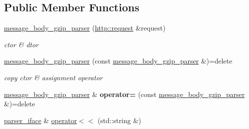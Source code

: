 \subsection*{Public Member Functions}
\begin{DoxyCompactItemize}
\item 
\mbox{\label{classnetflex_1_1parsing_1_1message__body__gzip__parser_a8f5b49b2af4bd6c96dad3959f04c763b}} 
\hyperlink{classnetflex_1_1parsing_1_1message__body__gzip__parser_a8f5b49b2af4bd6c96dad3959f04c763b}{message\+\_\+body\+\_\+gzip\+\_\+parser} (\hyperlink{classnetflex_1_1http_1_1request}{http\+::request} \&request)
\begin{DoxyCompactList}\small\item\em ctor \& dtor \end{DoxyCompactList}\item 
\mbox{\label{classnetflex_1_1parsing_1_1message__body__gzip__parser_a5c516454893dbda1a8ff93d7815b12a9}} 
\hyperlink{classnetflex_1_1parsing_1_1message__body__gzip__parser_a5c516454893dbda1a8ff93d7815b12a9}{message\+\_\+body\+\_\+gzip\+\_\+parser} (const \hyperlink{classnetflex_1_1parsing_1_1message__body__gzip__parser}{message\+\_\+body\+\_\+gzip\+\_\+parser} \&)=delete
\begin{DoxyCompactList}\small\item\em copy ctor \& assignment operator \end{DoxyCompactList}\item 
\mbox{\label{classnetflex_1_1parsing_1_1message__body__gzip__parser_ab28726f6d793f340cb630cfcaa6e3126}} 
\hyperlink{classnetflex_1_1parsing_1_1message__body__gzip__parser}{message\+\_\+body\+\_\+gzip\+\_\+parser} \& {\bfseries operator=} (const \hyperlink{classnetflex_1_1parsing_1_1message__body__gzip__parser}{message\+\_\+body\+\_\+gzip\+\_\+parser} \&)=delete
\item 
\mbox{\label{classnetflex_1_1parsing_1_1message__body__gzip__parser_a5adc84970912dcd766bb559dff7fe582}} 
\hyperlink{classnetflex_1_1parsing_1_1parser__iface}{parser\+\_\+iface} \& \hyperlink{classnetflex_1_1parsing_1_1message__body__gzip__parser_a5adc84970912dcd766bb559dff7fe582}{operator$<$$<$} (std\+::string \&)

\end{DoxyCompactItemize}
